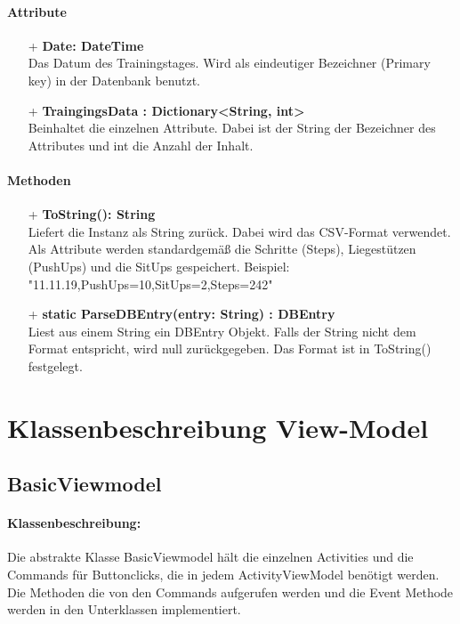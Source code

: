 \documentclass[a4paper,12pt]{article}
\begin{document}
	\paragraph{Attribute}
	\begin{itemize}
		\item[+] \textbf{Date: DateTime}\\Das Datum des Trainingstages. Wird als eindeutiger Bezeichner (Primary key) in der \Gls{Datenbank} benutzt.\\
			\item[+] \textbf{TraingingsData : Dictionary<String, int>}\\ Beinhaltet die einzelnen Attribute. Dabei ist der String der Bezeichner des Attributes und int die Anzahl der Inhalt. 
	\end{itemize}
	 
	 \paragraph{Methoden}
	 \begin{itemize}
	 	\item[+] \textbf{ToString(): String}\\Liefert die Instanz als String zurück. Dabei wird das \gls{CSV}-Format verwendet. Als Attribute werden standardgemäß die Schritte (Steps), Liegestützen (PushUps) und die SitUps gespeichert.
	 	Beispiel: "11.11.19,PushUps=10,SitUps=2,Steps=242"\\
	 	\item[+] \textbf{static ParseDBEntry(entry: String) : DBEntry}\\Liest aus einem String ein DBEntry Objekt. Falls der String nicht dem Format entspricht, wird null zurückgegeben. Das Format ist in ToString() festgelegt.\\
	\end{itemize}











\section{Klassenbeschreibung View-Model}
\subsection{BasicViewmodel} %
\paragraph{Klassenbeschreibung:}
Die abstrakte Klasse BasicViewmodel hält die einzelnen Activities und die Commands für Buttonclicks, die in jedem ActivityViewModel benötigt werden. Die Methoden die von den Commands aufgerufen werden und die Event Methode werden in den Unterklassen implementiert. 
\end{document}
